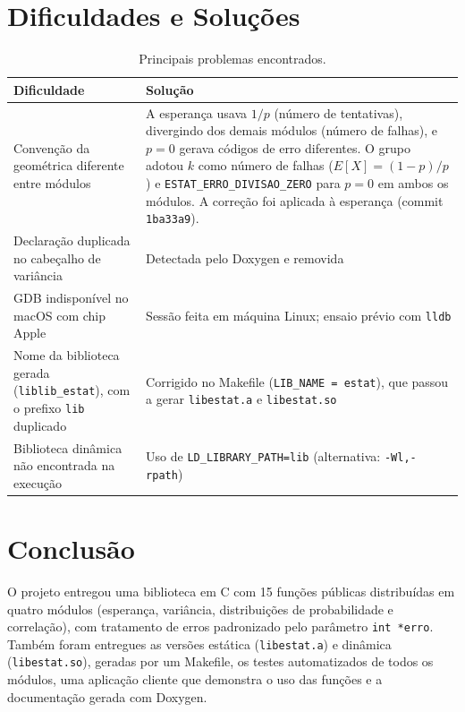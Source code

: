 \documentclass[12pt,a4paper]{article}
\newcommand{\cod}[1]{\texttt{#1}}
\begin{document}
\section{Dificuldades e Soluções}
\begin{table}[h]
\centering
\small
\begin{tabular}{@{}p{5cm}p{9cm}@{}}
\toprule
Dificuldade & Solução \\
\midrule
Convenção da geométrica diferente entre módulos & 
A esperança usava $1/p$ (número de tentativas), divergindo dos demais módulos (número de falhas), e $p = 0$ gerava códigos de erro diferentes. O grupo adotou $k$ como número de falhas ($E[X]=(1-p)/p$) e \cod{ESTAT\_ERRO\_DIVISAO\_ZERO} para $p = 0$ em ambos os módulos. A correção foi aplicada à esperança (commit \cod{1ba33a9}). \\
Declaração duplicada no cabeçalho de variância & Detectada pelo Doxygen e removida \\
GDB indisponível no macOS com chip Apple & 
Sessão feita em máquina Linux; ensaio prévio com \cod{lldb} \\
Nome da biblioteca gerada (\cod{liblib\_estat}), com o prefixo \cod{lib} duplicado & Corrigido no Makefile (\cod{LIB\_NAME = estat}), que passou a gerar \cod{libestat.a} e \cod{libestat.so} \\
Biblioteca dinâmica não encontrada na execução & Uso de \cod{LD\_LIBRARY\_PATH=lib} (alternativa: \cod{-Wl,-rpath}) \\
\bottomrule
\end{tabular}
\caption{Principais problemas encontrados.}
\end{table}

\section{Conclusão}
O projeto entregou uma biblioteca em C com 15 funções públicas distribuídas em quatro módulos (esperança, variância, distribuições de probabilidade e correlação), com tratamento de erros padronizado pelo parâmetro \cod{int *erro}. 
Também foram entregues as versões estática (\cod{libestat.a}) e dinâmica (\cod{libestat.so}), geradas por um Makefile, os testes automatizados de todos os módulos, uma aplicação cliente que demonstra o uso das funções e a documentação gerada com Doxygen.
\end{document}
